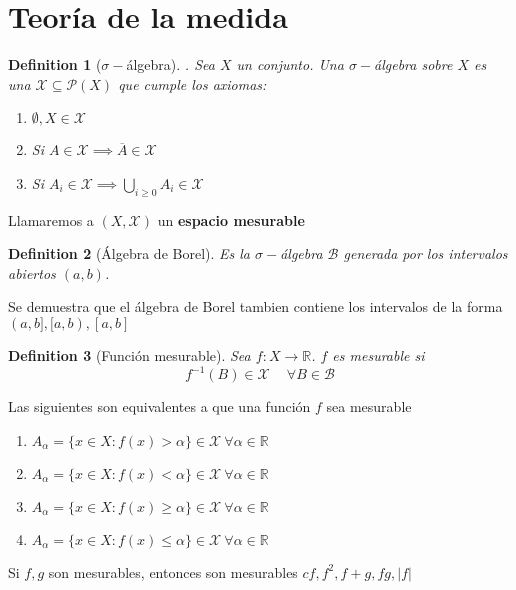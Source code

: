 \documentclass[leqno]{article}
\newtheorem*{definition}{Definition}
\begin{document}
\section{Teoría de la medida}
\begin{definition}[$\sigma -$álgebra]. Sea $X$ un conjunto. Una  $\sigma -$álgebra sobre $X$ es una  $\mathcal{X} \subseteq \mathcal{P}(X)$ que cumple los axiomas:
  \begin{enumerate}[topsep=-6pt, itemsep=0pt]
    \item $\emptyset, X \in \mathcal{X}$
	\item Si $A\in \mathcal{X} \implies \overline{A}\in \mathcal{X}$ 
	\item Si $A_i \in \mathcal{X} \implies \bigcup_{i\ge 0}A_i \in \mathcal{X}$
  \end{enumerate}
\end{definition}

Llamaremos a $(X, \mathcal{X})$ un \textbf{espacio mesurable}

\begin{definition}[Álgebra de Borel] Es la $\sigma -$álgebra $\mathcal{B}$ generada por los intervalos abiertos $(a,b)$.
\end{definition}

Se demuestra que el álgebra de Borel tambien contiene los intervalos de la forma $(a, b], [a, b), [a, b]$

\begin{definition}[Función mesurable] Sea $f:X \to \mathbb{R}$. $f$ es mesurable si
   \[
 f^{-1}(B)\in \mathcal{X} \quad \ \forall B \in \mathcal{B}
  \] 
\end{definition}

Las siguientes son equivalentes a que una función $f$ sea mesurable
\begin{enumerate}[topsep=-6pt, itemsep=0pt]
  \item $A_{\alpha} = \{x \in X : f(x)>\alpha \}\in \mathcal{X} \ \forall \alpha \in \mathbb{R}$
  \item $A_{\alpha} = \{x \in X : f(x)<\alpha \}\in \mathcal{X} \ \forall \alpha \in \mathbb{R}$
  \item $A_{\alpha} = \{x \in X : f(x) \ge \alpha \}\in \mathcal{X} \ \forall \alpha \in \mathbb{R}$
  \item $A_{\alpha} = \{x \in X : f(x)\le \alpha \}\in \mathcal{X} \ \forall \alpha \in \mathbb{R}$
\end{enumerate}

Si $f, g$ son mesurables, entonces son mesurables $cf, f^2, f+g, fg, |f|$
\end{document}
